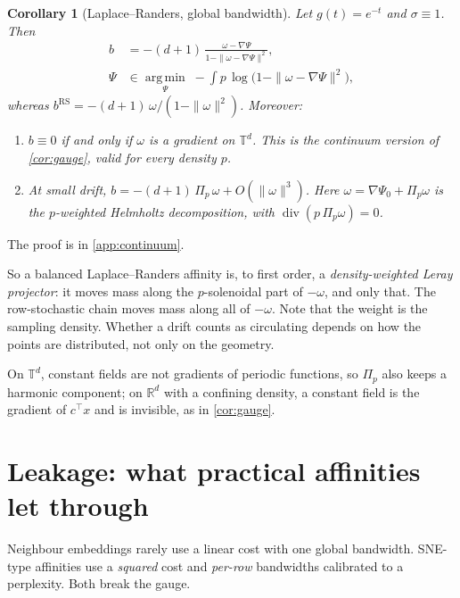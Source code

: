 \documentclass{article}
\theoremstyle{plain}
\newtheorem{corollary}[theorem]{Corollary}
\theoremstyle{definition}
\theoremstyle{remark}
\newcommand{\R}{\mathbb{R}}
\newcommand{\T}{\mathbb{T}}
\newcommand{\1}{\mathbf{1}}
\newcommand{\dv}{\operatorname{div}}
\newcommand{\RS}{\operatorname{RS}}
\newcommand{\Leray}{\Pi}
\begin{document}
\begin{corollary}[Laplace--Randers, global bandwidth]
  \label{cor:laplace}
  Let $g(t)=e^{-t}$ and $\sigma\equiv1$. Then
  \begin{align*}
    b&=-(d+1)\,\frac{\omega-\nabla\Psi}{1-\|\omega-\nabla\Psi\|^2},\\
    \Psi&\in\operatorname*{arg\,min}_{\Psi}\;-\!\int p\,\log\!\big(1-\|\omega-\nabla\Psi\|^2\big),
  \end{align*}
  whereas $b^{\RS}=-(d+1)\,\omega/(1-\|\omega\|^2)$. Moreover:
  \begin{enumerate}
    \item $b\equiv0$ if and only if $\omega$ is a gradient on $\T^d$.
      This is the continuum version of \cref{cor:gauge}, valid for every
      density $p$.
    \item At small drift, $b=-(d+1)\,\Leray_p\,\omega+O(\|\omega\|^3)$.
      Here $\omega=\nabla\Psi_0+\Leray_p\omega$ is the $p$-weighted
      Helmholtz decomposition, with $\dv(p\,\Leray_p\omega)=0$.
  \end{enumerate}
\end{corollary}

The proof is in \cref{app:continuum}.

So a balanced Laplace--Randers affinity is, to first order, a
\emph{density-weighted Leray projector}: it moves mass along the
$p$-solenoidal part of $-\omega$, and only that. The row-stochastic chain
moves mass along all of $-\omega$. Note that the weight is the sampling
density. Whether a drift counts as circulating depends on how the points
are distributed, not only on the geometry.

On $\T^d$, constant fields are not gradients of periodic functions, so
$\Leray_p$ also keeps a harmonic component; on $\R^d$ with a confining
density, a constant field is the gradient of $c^\top x$ and is invisible,
as in \cref{cor:gauge}.

\section{Leakage: what practical affinities let through}
\label{sec:leak}

Neighbour embeddings rarely use a linear cost with one global bandwidth.
SNE-type affinities use a \emph{squared} cost and \emph{per-row}
bandwidths calibrated to a perplexity. Both break the gauge.
\end{document}

